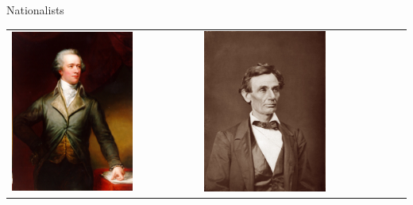 \begin{frame}{Nationalists}
\begin{table}[h]
\centering
\begin{tabular}{lcccccc} 
    \includegraphics[width=0.75\textwidth,height=.3\textheight,keepaspectratio=true]{img/hamilton-portrait.png} &
    \includegraphics[width=0.75\textwidth,height=.3\textheight,keepaspectratio=true]{img/lincoln-portrait.png} &

\end{tabular}
\end{table}
\end{frame}
